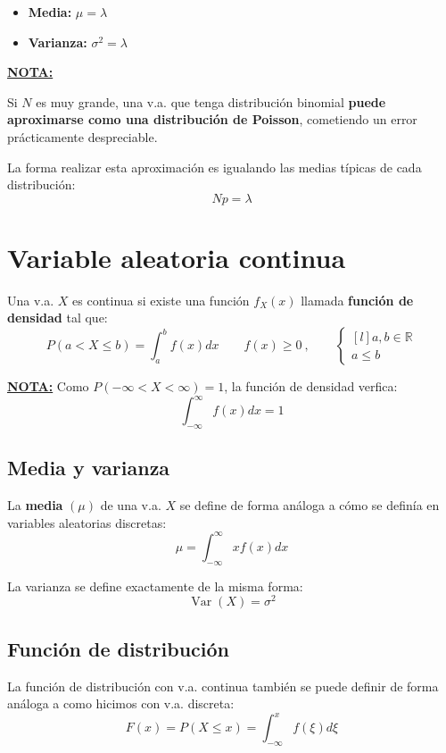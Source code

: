 \documentclass[a4paper]{book}
\numberwithin{figure}{section}
\numberwithin{equation}{subsection}
\numberwithin{figure}{chapter}
\theoremstyle{definition}
\newenvironment{nota}{\underline{\textbf{NOTA:}}}{}
\DeclareMathOperator{\Var}{Var}
\begin{document}
\begin{itemize}
	\item \textbf{Media:} $\displaystyle{\mu = \lambda}$
	\item \textbf{Varianza:} $\displaystyle{\sigma ^2 = \lambda}$
\end{itemize}

\begin{nota}

	Si $N$ es muy grande, una v.a. que tenga distribución binomial \textbf{puede aproximarse como una distribución de Poisson}, cometiendo un error prácticamente despreciable.

	La forma realizar esta aproximación es igualando las medias típicas de cada distribución: \[Np = \lambda\]
\end{nota}

\section{Variable aleatoria continua}
Una v.a. $X$ es continua si existe una función $f_X(x)$ llamada \textbf{función de densidad} tal que: \[\boxed{P\left( a<X\leq b \right) = \int_a^b{f(x)dx}} \qquad  f(x) \geq 0\: ,\qquad
	\left\{ \begin{matrix*}[l]
		a,b\in \mathbb{R}\\
		a\leq b
	\end{matrix*}\right. \]

\begin{nota}
	Como $P\left( -\infty < X < \infty \right) = 1$, la función de densidad verfica: \[\int_{-\infty}^{\infty}{f(x)dx} = 1\]
\end{nota}

\subsection{Media y varianza}
La \textbf{media} $(\mu)$ de una v.a. $X$ se define de forma análoga a cómo se definía en variables aleatorias discretas: \[\mu = \int_{-\infty}^{\infty}{x f(x) dx}\]

La varianza se define exactamente de la misma forma: \[\Var(X) = \sigma ^2\]

\subsection{Función de distribución}
La función de distribución con v.a. continua también se puede definir de forma análoga a como hicimos con v.a. discreta: \[\boxed{F(x) = P\left( X\leq x \right) = \int_{-\infty}^x{f(\xi )d\xi}}\]
\end{document}
